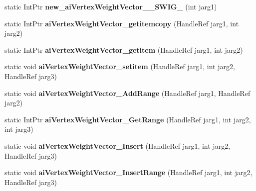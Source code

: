 \begin{DoxyCompactItemize}
\item 
\hypertarget{class_assimp_p_i_n_v_o_k_e_a24f4598dcb57dcd347aede700037d81d}{static Int\+Ptr {\bfseries new\+\_\+ai\+Vertex\+Weight\+Vector\+\_\+\+\_\+\+S\+W\+I\+G\+\_} (int jarg1)}\label{class_assimp_p_i_n_v_o_k_e_a24f4598dcb57dcd347aede700037d81d}

\item 
\hypertarget{class_assimp_p_i_n_v_o_k_e_a7fbaaf9d577a9b15cc3ea0ec4f10f250}{static Int\+Ptr {\bfseries ai\+Vertex\+Weight\+Vector\+\_\+getitemcopy} (Handle\+Ref jarg1, int jarg2)}\label{class_assimp_p_i_n_v_o_k_e_a7fbaaf9d577a9b15cc3ea0ec4f10f250}

\item 
\hypertarget{class_assimp_p_i_n_v_o_k_e_a7575a79b43bccf15a8309d237c6b9e7d}{static Int\+Ptr {\bfseries ai\+Vertex\+Weight\+Vector\+\_\+getitem} (Handle\+Ref jarg1, int jarg2)}\label{class_assimp_p_i_n_v_o_k_e_a7575a79b43bccf15a8309d237c6b9e7d}

\item 
\hypertarget{class_assimp_p_i_n_v_o_k_e_a55dd08665ac3203e0edf348bdc3b7ca8}{static void {\bfseries ai\+Vertex\+Weight\+Vector\+\_\+setitem} (Handle\+Ref jarg1, int jarg2, Handle\+Ref jarg3)}\label{class_assimp_p_i_n_v_o_k_e_a55dd08665ac3203e0edf348bdc3b7ca8}

\item 
\hypertarget{class_assimp_p_i_n_v_o_k_e_a1214adbb2db8b86bef5561dac98940cc}{static void {\bfseries ai\+Vertex\+Weight\+Vector\+\_\+\+Add\+Range} (Handle\+Ref jarg1, Handle\+Ref jarg2)}\label{class_assimp_p_i_n_v_o_k_e_a1214adbb2db8b86bef5561dac98940cc}

\item 
\hypertarget{class_assimp_p_i_n_v_o_k_e_aedc8bea2f133d287b4d0c84152027f61}{static Int\+Ptr {\bfseries ai\+Vertex\+Weight\+Vector\+\_\+\+Get\+Range} (Handle\+Ref jarg1, int jarg2, int jarg3)}\label{class_assimp_p_i_n_v_o_k_e_aedc8bea2f133d287b4d0c84152027f61}

\item 
\hypertarget{class_assimp_p_i_n_v_o_k_e_ab792c4ddc4f0c0a5de7199ed73b4b3f1}{static void {\bfseries ai\+Vertex\+Weight\+Vector\+\_\+\+Insert} (Handle\+Ref jarg1, int jarg2, Handle\+Ref jarg3)}\label{class_assimp_p_i_n_v_o_k_e_ab792c4ddc4f0c0a5de7199ed73b4b3f1}

\item 
\hypertarget{class_assimp_p_i_n_v_o_k_e_ac7ce9b4fe7a18009066ab8d3d67b94e9}{static void {\bfseries ai\+Vertex\+Weight\+Vector\+\_\+\+Insert\+Range} (Handle\+Ref jarg1, int jarg2, Handle\+Ref jarg3)}\label{class_assimp_p_i_n_v_o_k_e_ac7ce9b4fe7a18009066ab8d3d67b94e9}


\end{DoxyCompactItemize}
